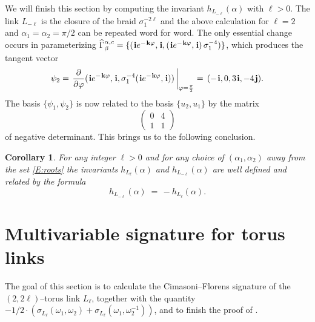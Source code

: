 \documentclass[11pt,reqno]{amsart}
\newtheorem{corollary}[theorem]{Corollary}
\theoremstyle{definition}
\renewcommand{\phi}{\varphi}
\renewcommand{\i}{\mspace{1.5mu}\mathbf i}
\renewcommand{\j}{\mspace{1.5mu}\mathbf j}
\renewcommand{\k}{\mspace{1.5mu}\mathbf k}
\begin{document}
\begin{sloppypar}
We will finish this section by computing the invariant $h_{L_{-\ell}} (\alpha)$ with $\ell > 0$. The link $L_{-\ell}$ is the closure of the braid $\sigma_1^{-2\ell}$ and the above calculation for $\ell = 2$ and $\alpha_1 = \alpha_2 = \pi/2$ can be repeated word for word. The only essential change occurs in parameterizing $\widehat{\Gamma}_{\beta}^{\alpha,c} = \{(\i e^{- \k \phi}, \i, (\i e^{- \k \phi}, \i)\,\sigma_1^{-4})\}$, which produces the tangent vector
\[
\psi_2 = \left. \frac{\partial}{\partial \phi} (\i e^{- \k \phi}, \i, \sigma_1^{- 4}(\i e^{- \k \phi}, \i))\,\right\vert_{\phi = \frac{\pi}{2}} = \, (- \i, 0, 3 \i, - 4 \j).
\]
The basis $\lbrace \psi_1, \psi_2 \rbrace$ is now related to the basis $\lbrace u_2, u_1 \rbrace$ by the matrix 
\[
\begin{pmatrix}
0 & 4 \\
1 & 1
\end{pmatrix}
\]
of negative determinant. This brings us to the following conclusion.

\begin{corollary}\label{C:h-sign}
For any integer $\ell > 0$ and for any choice of $(\alpha_1,\alpha_2)$ away from the set \eqref{E:roots} the invariants $h_{L_{\ell}}(\alpha)$ and $h_{L_{-\ell}}(\alpha)$ are well defined and related by the formula 
\[
h_{L_{-\ell}}(\alpha)\; = \, -h_{L_{\ell}} (\alpha).
\]
\end{corollary}

\section{Multivariable signature for torus links}\label{sec:six}
The goal of this section is to calculate the Cimasoni--Florens signature of the $(2, 2 \ell)$--torus link $L_{\ell}$, together with the quantity $- 1/2\cdot (\sigma_{L_{\ell}} (\omega_1, \omega_2) + \sigma_{L_{\ell}}(\omega_1, \omega_2^{- 1}))$, and to finish the proof of .



\end{sloppypar}
\end{document}
